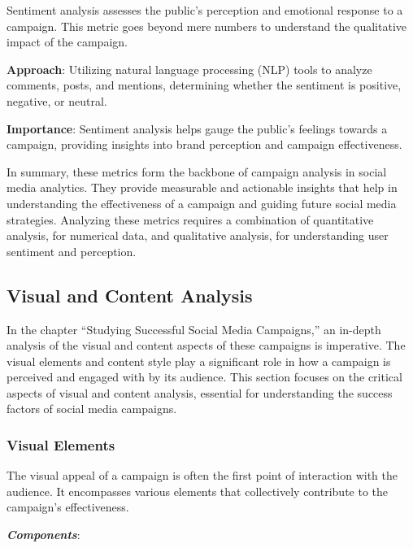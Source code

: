 \documentclass[
]{book}
\begin{document}
Sentiment analysis assesses the public's perception and emotional response to a campaign. This metric goes beyond mere numbers to understand the qualitative impact of the campaign.

\textbf{Approach}: Utilizing natural language processing (NLP) tools to analyze comments, posts, and mentions, determining whether the sentiment is positive, negative, or neutral.

\textbf{Importance}: Sentiment analysis helps gauge the public's feelings towards a campaign, providing insights into brand perception and campaign effectiveness.

In summary, these metrics form the backbone of campaign analysis in social media analytics. They provide measurable and actionable insights that help in understanding the effectiveness of a campaign and guiding future social media strategies. Analyzing these metrics requires a combination of quantitative analysis, for numerical data, and qualitative analysis, for understanding user sentiment and perception.

\hypertarget{visual-and-content-analysis}{%
\subsection*{Visual and Content Analysis}\label{visual-and-content-analysis}}

In the chapter ``Studying Successful Social Media Campaigns,'' an in-depth analysis of the visual and content aspects of these campaigns is imperative. The visual elements and content style play a significant role in how a campaign is perceived and engaged with by its audience. This section focuses on the critical aspects of visual and content analysis, essential for understanding the success factors of social media campaigns.

\hypertarget{visual-elements}{%
\subsubsection*{Visual Elements}\label{visual-elements}}

The visual appeal of a campaign is often the first point of interaction with the audience. It encompasses various elements that collectively contribute to the campaign's effectiveness.

\textbf{\emph{Components}}:
\end{document}
